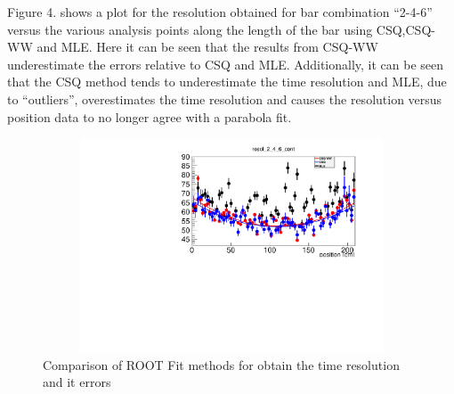 \documentclass[12pt]{article}
\begin{document}
Figure 4. shows a plot for the resolution obtained for bar combination ``2-4-6'' versus the various analysis points along the length of the bar using CSQ,CSQ-WW and MLE. Here it can be seen that the results from CSQ-WW underestimate the errors relative to CSQ and MLE. Additionally, it can be seen that the CSQ method tends to underestimate the time resolution and MLE, due to ``outliers'', overestimates the time resolution and causes the resolution versus position data to no longer agree with a parabola fit.  

\begin{figure}[ht]
	\includegraphics[height=2.5in,width=5.5in]{res_vs_pstn.pdf}
	\caption{Comparison of ROOT Fit methods for obtain the time resolution and it errors}
	\label{fig4}
\end{figure}  

\clearpage
\end{document}

